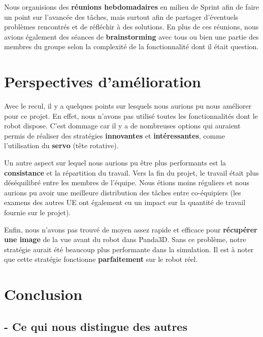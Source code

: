 \documentclass[12pt]{article}
\begin{document}
\hspace{\parindent}Nous organisions des \textbf{réunions hebdomadaires} en milieu de Sprint afin de faire un point sur l’avancée des tâches, mais surtout afin de partager d’éventuels problèmes rencontrés et de réfléchir à des solutions. En plus de ces réunions, nous avions également des séances de \textbf{brainstorming} avec tous ou bien une partie des membres du groupe selon la complexité de la fonctionnalité dont il était question.
 


\section*{Perspectives d'amélioration}

\hspace{\parindent}Avec le recul, il y a quelques points sur lesquels nous aurions pu nous améliorer pour ce projet. En effet, nous n’avons pas utilisé toutes les fonctionnalités dont le robot dispose. C'est dommage car il y a de nombreuses options qui auraient permis de réaliser des stratégies \textbf{innovantes} et \textbf{intéressantes}, comme l'utilisation du \textbf{servo} (tête rotative).

\hspace{\parindent}Un autre aspect sur lequel nous aurions pu être plus performants est la \textbf{consistance} et la répartition du travail. Vers la fin du projet, le travail était plus déséquilibré entre les membres de l’équipe. Nous étions moins réguliers et nous aurions pu avoir une meilleure distribution des tâches entre co-équipiers (les examens des autres UE ont également eu un impact sur la quantité de travail fournie sur le projet).

\hspace{\parindent} Enfin, nous n'avons pas trouvé de moyen assez rapide et efficace pour \textbf{récupérer une image} de la vue avant du robot dans Panda3D. Sans ce problème, notre stratégie aurait été beaucoup plus performante dans la simulation. Il est à noter que cette stratégie fonctionne \textbf{parfaitement} sur le robot réel. 


\newpage
\section*{Conclusion}

\subsection*{- Ce qui nous distingue des autres}
\end{document}

